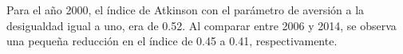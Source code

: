  Para el año 2000, el índice de Atkinson con el parámetro de aversión a la desigualdad igual a uno, era de 0.52. Al comparar entre 2006 y 2014, se observa una pequeña reducción en el índice de 0.45 a 0.41, respectivamente.